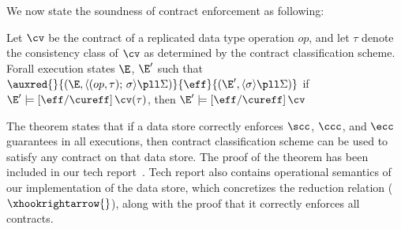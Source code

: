 

We now state the soundness of contract enforcement as following:

\begin{theorem}
\label{lem:core-preservation}
Let $\cv$ be the contract of a replicated data type operation $op$,
and let $\tau$ denote the consistency class of $\cv$ 
as determined by the contract classification scheme. Forall execution
states $\E$, $\E'$ such that 
$\auxred{} {(\E,\langle (op,\tau);\,\sigma \rangle \pll \Sigma)} {\eff} 
 {(\E',\langle \sigma \rangle \pll \Sigma)}$
if $\E' \models [\eff/\cureff]\,\cv(\tau)$, then $\E' \models [\eff/\cureff]\,\cv$ 
\end{theorem}

The theorem states that if a data store correctly enforces $\scc$,
$\ccc$, and $\ecc$ guarantees in all executions, then contract
classification scheme can be used to satisfy any \name contract on
that data store. The proof of the theorem has been included in our
tech report~\cite{techrep}. Tech report also contains operational
semantics of our implementation of the data store, which concretizes
the reduction relation ($\xhookrightarrow{}$), along with the proof
that it correctly enforces all \name contracts.
